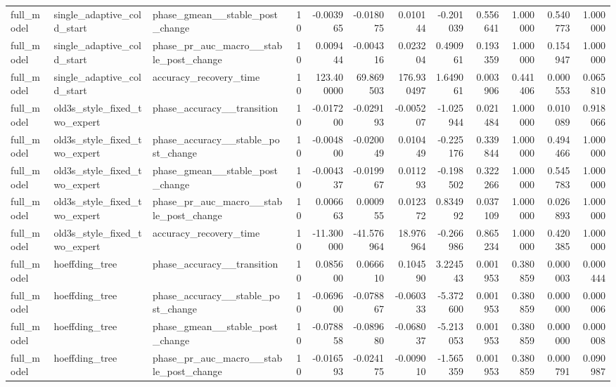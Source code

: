 \begin{tabular}{lllrrrrrrrrr}
full\_model & single\_adaptive\_cold\_start & phase\_gmean\_\_stable\_post\_change & 10 & -0.003965 & -0.018075 & 0.010144 & -0.201039 & 0.556641 & 1.000000 & 0.540773 & 1.000000 \\
full\_model & single\_adaptive\_cold\_start & phase\_pr\_auc\_macro\_\_stable\_post\_change & 10 & 0.009444 & -0.004316 & 0.023204 & 0.490961 & 0.193359 & 1.000000 & 0.154947 & 1.000000 \\
full\_model & single\_adaptive\_cold\_start & accuracy\_recovery\_time & 10 & 123.400000 & 69.869503 & 176.930497 & 1.649061 & 0.003906 & 0.441406 & 0.000553 & 0.065810 \\
full\_model & old3s\_style\_fixed\_two\_expert & phase\_accuracy\_\_transition & 10 & -0.017200 & -0.029193 & -0.005207 & -1.025944 & 0.021484 & 1.000000 & 0.010089 & 0.918066 \\
full\_model & old3s\_style\_fixed\_two\_expert & phase\_accuracy\_\_stable\_post\_change & 10 & -0.004800 & -0.020049 & 0.010449 & -0.225176 & 0.339844 & 1.000000 & 0.494466 & 1.000000 \\
full\_model & old3s\_style\_fixed\_two\_expert & phase\_gmean\_\_stable\_post\_change & 10 & -0.004337 & -0.019967 & 0.011293 & -0.198502 & 0.322266 & 1.000000 & 0.545783 & 1.000000 \\
full\_model & old3s\_style\_fixed\_two\_expert & phase\_pr\_auc\_macro\_\_stable\_post\_change & 10 & 0.006663 & 0.000955 & 0.012372 & 0.834992 & 0.037109 & 1.000000 & 0.026893 & 1.000000 \\
full\_model & old3s\_style\_fixed\_two\_expert & accuracy\_recovery\_time & 10 & -11.300000 & -41.576964 & 18.976964 & -0.266986 & 0.865234 & 1.000000 & 0.420385 & 1.000000 \\
full\_model & hoeffding\_tree & phase\_accuracy\_\_transition & 10 & 0.085600 & 0.066610 & 0.104590 & 3.224543 & 0.001953 & 0.380859 & 0.000003 & 0.000444 \\
full\_model & hoeffding\_tree & phase\_accuracy\_\_stable\_post\_change & 10 & -0.069600 & -0.078867 & -0.060333 & -5.372600 & 0.001953 & 0.380859 & 0.000000 & 0.000006 \\
full\_model & hoeffding\_tree & phase\_gmean\_\_stable\_post\_change & 10 & -0.078858 & -0.089680 & -0.068037 & -5.213053 & 0.001953 & 0.380859 & 0.000000 & 0.000008 \\
full\_model & hoeffding\_tree & phase\_pr\_auc\_macro\_\_stable\_post\_change & 10 & -0.016593 & -0.024175 & -0.009010 & -1.565359 & 0.001953 & 0.380859 & 0.000791 & 0.090987 \\

\end{tabular}
